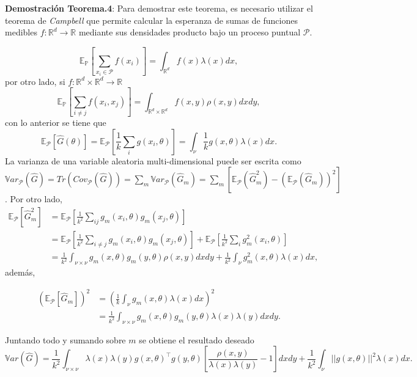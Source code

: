 \begin{appendixs}
    \textbf{Demostración Teorema.4}: 
    Para demostrar este teorema, es necesario utilizar el teorema de \textit{Campbell} que permite calcular la esperanza de sumas de funciones medibles $f: \mathbb{R}^d \rightarrow \mathbb{R}$ mediante sus densidades producto bajo un proceso puntual $\mathcal{P}$.
    
    \[
    \mathbb{E}_{\mathbb{P}}\left [ \sum_{x_i \in \mathcal{P}} f(x_i) \right] = \int_{\mathbb{R}^d} f(x)\lambda(x)dx , 
    \] 
    por otro lado, si $f: \mathbb{R}^d \times  \mathbb{R}^d \rightarrow \mathbb{R}$
    \[
    \mathbb{E}_{\mathbb{P}} \left [ \sum_{i \neq j} f(x_i,x_j) \right] = \int_{ \mathbb{R}^d \times  \mathbb{R}^d} f(x,y)\rho(x,y)dxdy , 
    \]
    con lo anterior se tiene que 
    \[
    \mathbb{E}_{\mathcal{P}}\left [ \hat{G}(\theta) \right] = \mathbb{E}_{\mathcal{P}} \left [ \frac{1}{k}\sum_{i}g(x_i,\theta) \right] = \int_{\nu} \frac{1}{k}g(x,\theta)\lambda(x)dx . 
    \] 
    La varianza de una variable aleatoria multi-dimensional puede ser escrita como $\mathbb{V}ar_{\mathcal{P}}(\hat{G}) = Tr(Cov_{\mathcal{P}}(\hat{G})) = \sum_m \mathbb{V}ar_{\mathcal{P}}(\hat{G}_m) = \sum_m \left [ \mathbb{E}_{\mathcal{P}}(\hat{G}^2_m) - (\mathbb{E}_{\mathcal{P}}(\hat{G}_m))^2 \right ]$. Por otro lado, 
    \begin{align*}
        \mathbb{E}_{\mathcal{P}}[\hat{G}^2_m] &= \mathbb{E}_{\mathcal{P}} \left [ \frac{1}{k^2} \sum_{ij} g_m(x_i, \theta)g_m(x_j,\theta) \right ] \\  
        &= \mathbb{E}_{\mathcal{P}} \left [ \frac{1}{k^2} \sum_{i \neq j} g_m(x_i, \theta)g_m(x_j,\theta) \right ] + \mathbb{E}_{\mathcal{P}} \left [ \frac{1}{k^2} \sum_{i} g_m^2(x_i, \theta)\right ] \\
        &= \frac{1}{k^2}\int_{\nu \times \nu}g_m(x,\theta)g_m(y,\theta)\rho(x,y)dxdy + \frac{1}{k^2}\int_{\nu}g^2_m(x,\theta)\lambda(x)dx , 
    \end{align*}
    además, 
    
    \begin{align*}
    (\mathbb{E}_{\mathcal{P}}[\hat{G}_m])^2 &= \left ( \frac{1}{k} \int_{\nu} g_m(x,\theta)\lambda(x)dx \right )^2 \\
    &= \frac{1}{k^2} \int_{\nu \times \nu}g_m(x,\theta)g_m(y,\theta)\lambda(x)\lambda(y)dxdy .
    \end{align*}
    
 
    \noindent Juntando todo y sumando sobre $m$ se obtiene el resultado deseado 
    \[
         \mathbb{V}ar(\hat{G}) = \frac{1}{k^2}\int_{\nu \times \nu}\lambda(x)\lambda(y)g(x,\theta)^{\top}g(y,\theta)\left [ \frac{\rho(x,y)}{\lambda(x)\lambda(y)} - 1\right ]dxdy
        + \frac{1}{k^2} \int_{\nu} ||g(x,\theta)||^2\lambda(x)dx . 
    \]
    

\end{appendixs}
